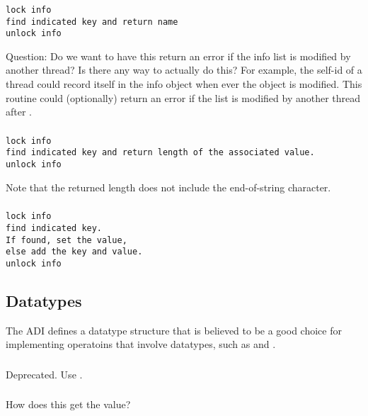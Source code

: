 \documentclass{article}
\begin{document}
\subsubsection{}
\begin{verbatim}
lock info
find indicated key and return name
unlock info
\end{verbatim}

Question:  Do we want to have this return an error if the info list is 
modified by another thread?  Is there any way to actually do this?  For
example, the self-id of a thread could record itself in the info object when
ever the object is modified.  This routine could (optionally) return an error
if the list is modified by another thread after .

\subsubsection{}
\begin{verbatim}
lock info
find indicated key and return length of the associated value.
unlock info
\end{verbatim}
Note that the returned length does not include the end-of-string character.

\subsubsection{}
\begin{verbatim}
lock info
find indicated key.  
If found, set the value,
else add the key and value.
unlock info

\end{verbatim}


\subsection{Datatypes}
The ADI defines a datatype structure that is believed to be a good
choice for implementing operatoins that involve datatypes, such as
 and .


\subsubsection{}
Deprecated.  Use .

\subsubsection{}
How does this get the value?
\end{document}
